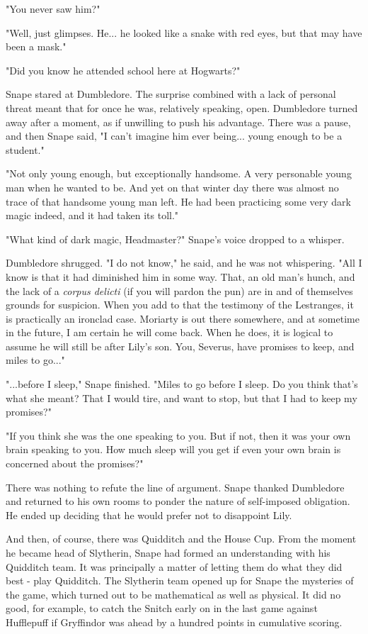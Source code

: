 "You never saw him?"

"Well, just glimpses. He... he looked like a snake with red eyes, but that may have been a mask."

"Did you know he attended school here at Hogwarts?"

Snape stared at Dumbledore. The surprise combined with a lack of personal threat meant that for once he was, relatively speaking, open. Dumbledore turned away after a moment, as if unwilling to push his advantage. There was a pause, and then Snape said, "I can't imagine him ever being... young enough to be a student."

"Not only young enough, but exceptionally handsome. A very personable young man when he wanted to be. And yet on that winter day there was almost no trace of that handsome young man left. He had been practicing some very dark magic indeed, and it had taken its toll."

"What kind of dark magic, Headmaster?" Snape's voice dropped to a whisper.

Dumbledore shrugged. "I do not know," he said, and he was not whispering. "All I know is that it had diminished him in some way. That, an old man's hunch, and the lack of a \emph{corpus delicti} (if you will pardon the pun) are in and of themselves grounds for suspicion. When you add to that the testimony of the Lestranges, it is practically an ironclad case. Moriarty is out there somewhere, and at sometime in the future, I am certain he will come back. When he does, it is logical to assume he will still be after Lily's son. You, Severus, have promises to keep, and miles to go..."

"...before I sleep," Snape finished. "Miles to go before I sleep. Do you think that's what she meant? That I would tire, and want to stop, but that I had to keep my promises?"

"If you think she was the one speaking to you. But if not, then it was your own brain speaking to you. How much sleep will you get if even your own brain is concerned about the promises?"

There was nothing to refute the line of argument. Snape thanked Dumbledore and returned to his own rooms to ponder the nature of self-imposed obligation. He ended up deciding that he would prefer not to disappoint Lily.

And then, of course, there was Quidditch and the House Cup. From the moment he became head of Slytherin, Snape had formed an understanding with his Quidditch team. It was principally a matter of letting them do what they did best - play Quidditch. The Slytherin team opened up for Snape the mysteries of the game, which turned out to be mathematical as well as physical. It did no good, for example, to catch the Snitch early on in the last game against Hufflepuff if Gryffindor was ahead by a hundred points in cumulative scoring.

